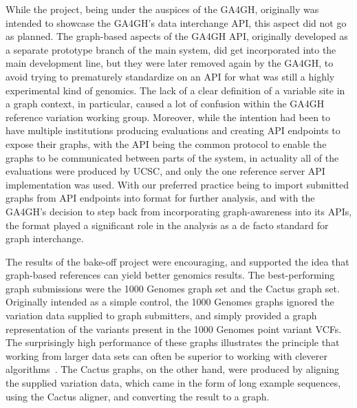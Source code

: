 While the project, being under the auspices of the GA4GH, originally was intended to showcase the GA4GH's data interchange API, this aspect did not go as planned. The graph-based aspects of the GA4GH API, originally developed as a separate prototype branch of the main system, did get incorporated into the main development line, but they were later removed again by the GA4GH, to avoid trying to prematurely  standardize on an API for what was still a highly experimental kind of genomics. The lack of a clear definition of a variable site in a graph context, in particular, caused a lot of confusion within the GA4GH reference variation working group. Moreover, while the intention had been to have multiple institutions producing evaluations and creating API endpoints to expose their graphs, with the API being the common protocol to enable the graphs to be communicated between parts of the system, in actuality all of the evaluations were produced by UCSC, and only the one reference server API implementation was used. With our preferred practice being to import submitted graphs from API endpoints into \vg format for further analysis, and with the GA4GH's decision to step back from incorporating graph-awareness into its APIs, the \vg format played a significant role in the analysis as a de facto standard for graph interchange.

The results of the bake-off project were encouraging, and supported the idea that graph-based references can yield better genomics results. The best-performing graph submissions were the 1000 Genomes graph set and the Cactus graph set. Originally intended as a simple control, the 1000 Genomes graphs ignored the variation data supplied to graph submitters, and simply provided a graph representation of the variants present in the 1000 Genomes point variant VCFs. The surprisingly high performance of these graphs illustrates the principle that working from larger data sets can often be superior to working with cleverer algorithms~\cite{halevy2009unreasonable}. The Cactus graphs, on the other hand, were produced by aligning the supplied variation data, which came in the form of long example sequences, using the Cactus aligner, and converting the result to a graph.

